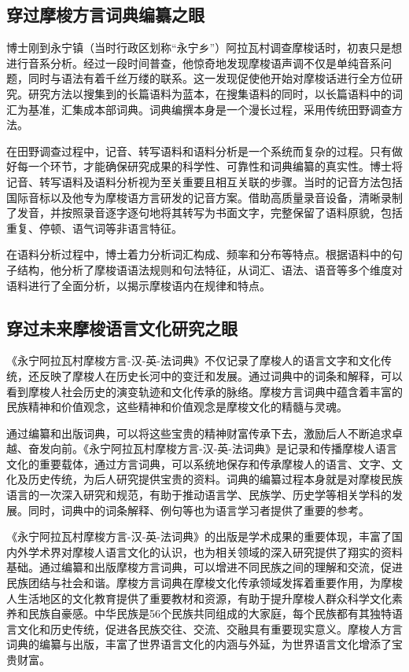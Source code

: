\subsection*{穿过摩梭方言词典编纂之眼}

博士刚到永宁镇（当时行政区划称“永宁乡”）阿拉瓦村调查摩梭话时，初衷只是想进行音系分析。经过一段时间普查，他惊奇地发现摩梭语声调不仅是单纯音系问题，同时与语法有着千丝万缕的联系。这一发现促使他开始对摩梭话进行全方位研究。研究方法以搜集到的长篇语料为蓝本，在搜集语料的同时，以长篇语料中的词汇为基准，汇集成本部词典。词典编撰本身是一个漫长过程，采用传统田野调查方法。

在田野调查过程中，记音、转写语料和语料分析是一个系统而复杂的过程。只有做好每一个环节，才能确保研究成果的科学性、可靠性和词典编纂的真实性。博士将记音、转写语料及语料分析视为至关重要且相互关联的步骤。当时的记音方法包括国际音标以及他专为摩梭语方言研发的记音方案。借助高质量录音设备，清晰录制了发音，并按照录音逐字逐句地将其转写为书面文字，完整保留了语料原貌，包括重复、停顿、语气词等非语言特征。

在语料分析过程中，博士着力分析词汇构成、频率和分布等特点。根据语料中的句子结构，他分析了摩梭语语法规则和句法特征，从词汇、语法、语音等多个维度对语料进行了全面分析，以揭示摩梭语内在规律和特点。

\subsection*{穿过未来摩梭语言文化研究之眼}

《永宁阿拉瓦村摩梭方言-汉-英-法词典》不仅记录了摩梭人的语言文字和文化传统，还反映了摩梭人在历史长河中的变迁和发展。通过词典中的词条和解释，可以看到摩梭人社会历史的演变轨迹和文化传承的脉络。摩梭方言词典中蕴含着丰富的民族精神和价值观念，这些精神和价值观念是摩梭文化的精髓与灵魂。

通过编纂和出版词典，可以将这些宝贵的精神财富传承下去，激励后人不断追求卓越、奋发向前。《永宁阿拉瓦村摩梭方言-汉-英-法词典》是记录和传播摩梭人语言文化的重要载体，通过方言词典，可以系统地保存和传承摩梭人的语言、文字、文化及历史传统，为后人研究提供宝贵的资料。词典的编纂过程本身就是对摩梭民族语言的一次深入研究和规范，有助于推动语言学、民族学、历史学等相关学科的发展。同时，词典中的词条解释、例句等也为语言学习者提供了重要的参考。

《永宁阿拉瓦村摩梭方言-汉-英-法词典》的出版是学术成果的重要体现，丰富了国内外学术界对摩梭人语言文化的认识，也为相关领域的深入研究提供了翔实的资料基础。通过编纂和出版摩梭方言词典，可以增进不同民族之间的理解和交流，促进民族团结与社会和谐。摩梭方言词典在摩梭文化传承领域发挥着重要作用，为摩梭人生活地区的文化教育提供了重要教材和资源，有助于提升摩梭人群众科学文化素养和民族自豪感。中华民族是56个民族共同组成的大家庭，每个民族都有其独特语言文化和历史传统，促进各民族交往、交流、交融具有重要现实意义。摩梭人方言词典的编纂与出版，丰富了世界语言文化的内涵与外延，为世界语言文化增添了宝贵财富。

